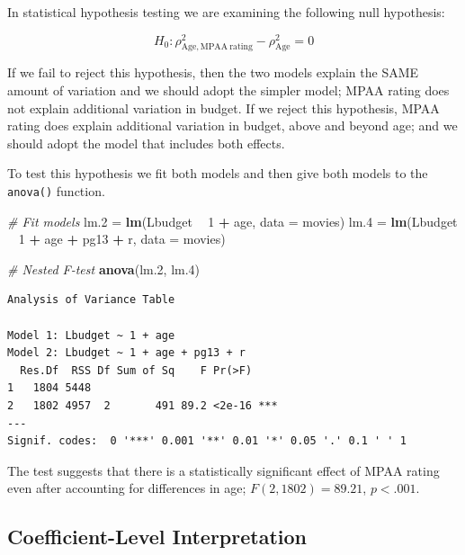 \documentclass[]{book}
\newenvironment{Shaded}{\begin{snugshade}}{\end{snugshade}}
\newcommand{\CommentTok}[1]{\textcolor[rgb]{0.56,0.35,0.01}{\textit{#1}}}
\newcommand{\DataTypeTok}[1]{\textcolor[rgb]{0.13,0.29,0.53}{#1}}
\newcommand{\DecValTok}[1]{\textcolor[rgb]{0.00,0.00,0.81}{#1}}
\newcommand{\FloatTok}[1]{\textcolor[rgb]{0.00,0.00,0.81}{#1}}
\newcommand{\KeywordTok}[1]{\textcolor[rgb]{0.13,0.29,0.53}{\textbf{#1}}}
\newcommand{\NormalTok}[1]{#1}
\newcommand{\OperatorTok}[1]{\textcolor[rgb]{0.81,0.36,0.00}{\textbf{#1}}}
\newcommand{\StringTok}[1]{\textcolor[rgb]{0.31,0.60,0.02}{#1}}
\begin{document}
In statistical hypothesis testing we are examining the following null hypothesis:

\[
H_0: \rho^2_{\mathrm{Age},\mathrm{MPAA~rating}} - \rho^2_{\mathrm{Age}} = 0
\]

If we fail to reject this hypothesis, then the two models explain the SAME amount of variation and we should adopt the simpler model; MPAA rating does not explain additional variation in budget. If we reject this hypothesis, MPAA rating does explain additional variation in budget, above and beyond age; and we should adopt the model that includes both effects.

To test this hypothesis we fit both models and then give both models to the \texttt{anova()} function.

\begin{Shaded}
\begin{Highlighting}[]
\CommentTok{# Fit models}
\NormalTok{lm}\FloatTok{.2}\NormalTok{ =}\StringTok{ }\KeywordTok{lm}\NormalTok{(Lbudget }\OperatorTok{~}\StringTok{ }\DecValTok{1} \OperatorTok{+}\StringTok{ }\NormalTok{age,            }\DataTypeTok{data =}\NormalTok{ movies)}
\NormalTok{lm}\FloatTok{.4}\NormalTok{ =}\StringTok{ }\KeywordTok{lm}\NormalTok{(Lbudget }\OperatorTok{~}\StringTok{ }\DecValTok{1} \OperatorTok{+}\StringTok{ }\NormalTok{age }\OperatorTok{+}\StringTok{ }\NormalTok{pg13 }\OperatorTok{+}\StringTok{ }\NormalTok{r, }\DataTypeTok{data =}\NormalTok{ movies)}

\CommentTok{# Nested F-test}
\KeywordTok{anova}\NormalTok{(lm}\FloatTok{.2}\NormalTok{, lm}\FloatTok{.4}\NormalTok{)}
\end{Highlighting}
\end{Shaded}

\begin{verbatim}
Analysis of Variance Table

Model 1: Lbudget ~ 1 + age
Model 2: Lbudget ~ 1 + age + pg13 + r
  Res.Df  RSS Df Sum of Sq    F Pr(>F)    
1   1804 5448                             
2   1802 4957  2       491 89.2 <2e-16 ***
---
Signif. codes:  0 '***' 0.001 '**' 0.01 '*' 0.05 '.' 0.1 ' ' 1
\end{verbatim}

The test suggests that there is a statistically significant effect of MPAA rating even after accounting for differences in age; \(F(2, 1802)=89.21\), \(p<.001\).

\hypertarget{coefficient-level-interpretation}{%
\subsection{Coefficient-Level Interpretation}\label{coefficient-level-interpretation}}
\end{document}
